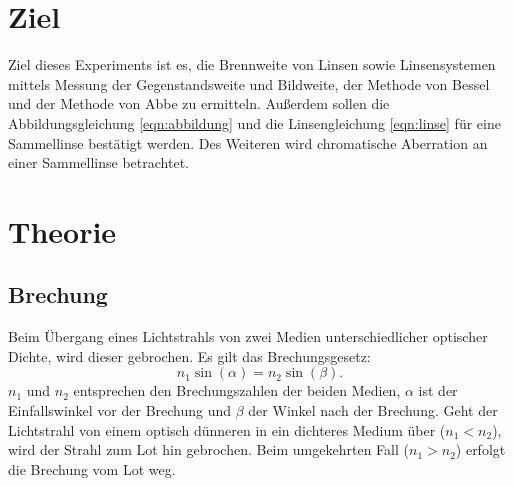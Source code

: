 \section{Ziel}
\label{sec:Ziel}
Ziel dieses Experiments ist es, die Brennweite von Linsen sowie Linsensystemen mittels Messung der Gegenstandsweite und Bildweite, der Methode von Bessel und der Methode von Abbe zu ermitteln. Außerdem sollen die Abbildungsgleichung \eqref{eqn:abbildung} und die Linsengleichung \eqref{eqn:linse} für eine Sammellinse bestätigt werden. Des Weiteren wird chromatische Aberration an einer Sammellinse betrachtet.


\section{Theorie}
\label{sec:theorie}
\subsection{Brechung}
Beim Übergang eines Lichtstrahls von zwei Medien unterschiedlicher optischer Dichte, wird dieser gebrochen. Es gilt das Brechungsgesetz:
\begin{equation}
n_1 \sin(\alpha)=n_2 \sin(\beta).
\end{equation}
$n_1$ und $n_2$ entsprechen den Brechungszahlen der beiden Medien, $\alpha$ ist der Einfallswinkel vor der Brechung und $\beta$ der Winkel nach der Brechung. Geht der Lichtstrahl von einem optisch dünneren in ein dichteres Medium über ($n_1 < n_2$), wird der Strahl zum Lot hin gebrochen. Beim umgekehrten Fall ($n_1 > n_2$) erfolgt die Brechung vom Lot weg.
